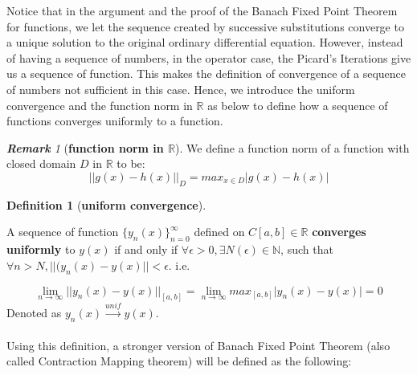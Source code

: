 \documentclass{article}
\theoremstyle{definition}
\newtheorem{definition}{Definition}[section]
\theoremstyle{remark}
\newtheorem*{remark}{\textbf{Remark}}
\theoremstyle{example}
\begin{document}
Notice that in the argument and the proof of the Banach Fixed Point Theorem for functions, we let the sequence created by successive substitutions converge to a unique solution to the original ordinary differential equation. However, instead of having a sequence of numbers, in the operator case, the Picard's Iterations give us a sequence of function. This makes the definition of convergence of a sequence of numbers not sufficient in this case. Hence, we introduce the uniform convergence and the function norm in $\mathbb{R}$ as below to define how a sequence of functions converges uniformly to a function.

\begin{remark}[\textbf{function norm in $\mathbb{R}$}]
    We define a function norm of a function with closed domain $D$ in $\mathbb{R}$ to be:
    \begin{equation}
        \lvert\lvert g(x) - h(x) \rvert\rvert_{D} = max_{x\in D}{\lvert g(x) - h(x)\rvert}
    \end{equation}
\end{remark}

\begin{definition}[\textbf{uniform convergence}]\label{def:uniConv}

A sequence of function $\{y_n(x)\}_{n = 0}^{\infty}$ defined on $C[a,b] \in \mathbb{R}$ \textbf{converges uniformly} to $y(x)$ if and only if $\forall \epsilon > 0, \exists N(\epsilon) \in \mathbb{N}$, such that $\forall n > N, {\lvert\lvert(y_n(x) - y(x)\rvert\rvert} < \epsilon$. i.e. 

\begin{equation}
    \lim_{n \to \infty}{\lvert\lvert y_n(x) - y(x) \rvert\rvert_{[a,b]}} = \lim_{n \to \infty}{max_{[a,b]}{\lvert y_n(x)-y(x)\rvert}} = 0
\end{equation}
Denoted as $y_n(x) \xrightarrow{unif} y(x)$.
\end{definition}

\paragraph{  }

Using this definition, a stronger version of Banach Fixed Point Theorem (also called Contraction Mapping theorem) will be defined as the following:
\end{document}
